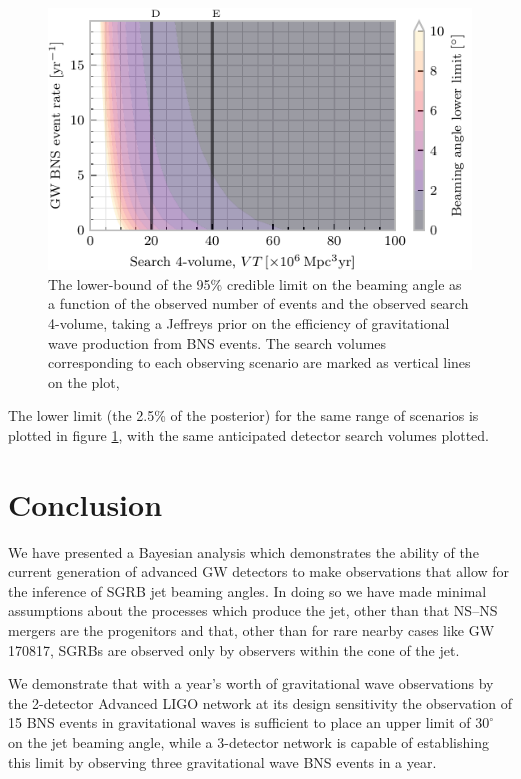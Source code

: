 \documentclass[twocolumn,nofootinbib]{revtex4-1}
\newcommand{\BNS}{\ac{NS}--\ac{NS}\xspace}
\begin{document}
\begin{figure}
\centering
\includegraphics[width=\linewidth]{volume_v_nevents_lower.pdf}
\caption{\label{fig:volumevevents_lower} The lower-bound of the 95\%
  credible limit on the beaming angle as a function of the observed
  number of events and the observed search 4-volume, taking a Jeffreys
  prior on the efficiency of gravitational wave production from BNS
  events. The search volumes corresponding to each observing scenario
  are marked as vertical lines on the plot, }
\end{figure}

The lower limit (the 2.5\% of the posterior) for the same range of
scenarios is plotted in figure \ref{fig:volumevevents_lower}, with the
same anticipated detector search volumes plotted.

\section{Conclusion}

We have presented a Bayesian analysis which demonstrates the ability
of the current generation of advanced \ac{GW} detectors to make observations
that allow for the inference of \ac{SGRB} jet beaming angles. In doing so we
have made minimal assumptions about the processes which produce the jet, other
than that \BNS mergers are the progenitors and that, other than for rare nearby
cases like GW 170817, \acp{SGRB} are observed only by observers within the cone
of the jet.

We demonstrate that with a year's worth of gravitational wave
observations by the 2-detector Advanced LIGO network at its design
sensitivity the observation of 15 BNS events in gravitational waves is
sufficient to place an upper limit of $30^{\circ}$ on the jet beaming
angle, while a 3-detector network is capable of establishing this
limit by observing three gravitational wave BNS events in a year.
\end{document}

